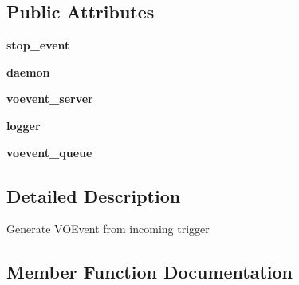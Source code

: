 \subsection*{Public Attributes}
\begin{DoxyCompactItemize}
\item 
\mbox{\label{classdarc_1_1voevent__generator_1_1_v_o_event_generator_ad11b3632240accdf914588c881337ea5}} 
{\bfseries stop\+\_\+event}
\item 
\mbox{\label{classdarc_1_1voevent__generator_1_1_v_o_event_generator_a411ec014efd2b95bf06f1cfb83aa093c}} 
{\bfseries daemon}
\item 
\mbox{\label{classdarc_1_1voevent__generator_1_1_v_o_event_generator_a6e8f2d09b287b6828b41129fa55a10f0}} 
{\bfseries voevent\+\_\+server}
\item 
\mbox{\label{classdarc_1_1voevent__generator_1_1_v_o_event_generator_a6dc1967631bea5cd08b09651d1a08547}} 
{\bfseries logger}
\item 
\mbox{\label{classdarc_1_1voevent__generator_1_1_v_o_event_generator_ad5d58f0552703b8ac7467d272d257fe6}} 
{\bfseries voevent\+\_\+queue}
\end{DoxyCompactItemize}


\subsection{Detailed Description}
\begin{DoxyVerb}Generate VOEvent from incoming trigger
\end{DoxyVerb}
 

\subsection{Member Function Documentation}
\mbox{\label{classdarc_1_1voevent__generator_1_1_v_o_event_generator_a71faea7382ec9a7aaf0a913228383b4c}} 
